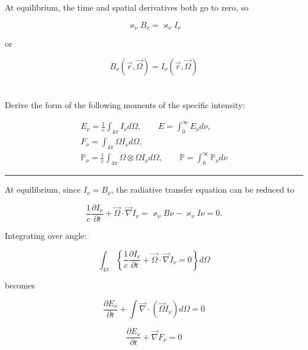 \documentclass{template}
\begin{document}
At equilibrium, the time and spatial derivatives both go to zero, so

\begin{equation}
    \varkappa_\nu B_\nu = \varkappa_\nu I_\nu
\end{equation}

or

\begin{equation}
    \boxed{B_\nu (\vec{r}, \vec{\Omega}) = I_\nu(\vec{r}, \vec{\Omega})}
\end{equation}


\section{} Derive the form of the following moments of the specific intensity:

\begin{gather*}
    E_\nu = \frac{1}{c} \int_{4\pi} I_\nu d\Omega, \qquad E = \int_0^\infty E_{\nu} d \nu,\\
    F_\nu = \int_{4\pi} \Omega I_\nu d\Omega,\\
    \mathbb{P}_\nu = \frac{1}{c} \int_{4\pi} \Omega \otimes \Omega I_\nu d\Omega, \qquad \mathbb{P} = \int_{0}^{\infty}\mathbb{P}_\nu d\nu
\end{gather*}

\hrule

At equilibrium, since $I_\nu = B_\nu$, the radiative transfer equation can be reduced to

\begin{equation}
    \frac{1}{c}\frac{\partial I_\nu}{\partial t} + \vec{\Omega}\cdot\vec{\nabla}I_\nu  = \varkappa_\nu B\nu- \varkappa_\nu I\nu = 0.
\end{equation}


Integrating over angle:

\begin{equation}
    \int_{4\pi} {\left\{\frac{1}{c}\frac{\partial I_\nu}{\partial t} + \vec{\Omega}\cdot\vec{\nabla}I_\nu =0\right\}} d\Omega
\end{equation}

becomes

\begin{equation}
    \frac{\partial E_\nu}{\partial t} + \int{\vec{\nabla}\cdot\left(\vec{\Omega} I_\nu\right)} d\Omega = 0
\end{equation}

\begin{equation}
    \boxed{\frac{\partial E_\nu}{\partial t} + \vec{\nabla}F_\nu = 0}
\end{equation}
\end{document}
